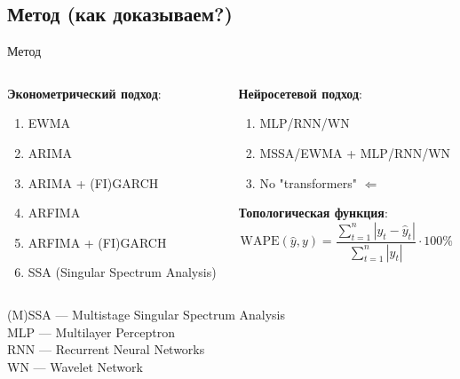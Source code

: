 \documentclass[11pt, aspectratio= 169]{beamer}
\begin{document}
	\subsection{Метод (как доказываем?)}
	\begin{frame}{Метод}
		\begin{columns}
			\begin{column}{0.5\textwidth}
				\textbf{Эконометрический подход}:
				\begin{center}
					\begin{enumerate}
						\item EWMA
						\item ARIMA
						\item ARIMA + (FI)GARCH
						\item ARFIMA
						\item ARFIMA + (FI)GARCH
						\item SSA (Singular Spectrum Analysis)
					\end{enumerate}
				\end{center}
			\end{column}
			\hfill
			\begin{column}{0.5\textwidth}
				\textbf{Нейросетевой подход}:
				\begin{center}
					\begin{enumerate}
						\item MLP/RNN/WN
						\item MSSA/EWMA + MLP/RNN/WN
						\item No "transformers" $\Leftarrow$ \cite{zeng2022transformers}
					\end{enumerate}
				\end{center}
				\textbf{Топологическая функция}:
				\begin{equation}
					\text{WAPE}(\hat{y}, y) = \frac{\sum_{t= 1}^n |y_t - \hat{y}_t|}{\sum_{t= 1}^n |y_t|} \cdot 100\%
				\end{equation}
			\end{column}
		\end{columns}
		\vspace{1cm}
		(M)SSA --- Multistage Singular Spectrum Analysis \cite{kuang2020efficient}\\
		MLP --- Multilayer Perceptron \cite{rosenblatt1961principles}\\
		RNN --- Recurrent Neural Networks \cite{hochreiter1997long}\\
		WN --- Wavelet Network \cite{alexandridis2014wavelet}
	\end{frame}
	
\end{document}
